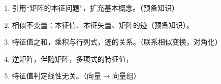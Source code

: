 

\begin{issues}
\issueDraft
\begin{enumerate}
\item 引用“矩阵的本征问题”，扩充基本概念。（预备知识）
\item 相似不变量：本征值、本征矢量、矩阵的迹（预备知识）。
\item 特征值之和，乘积与行列式，迹的关系。（联系相似变换，对角化）
\item 逆矩阵，伴随矩阵，多项式的特征值，
\item 特征值判定线性无关。（向量$\rightarrow$向量组）
\end{enumerate}
\end{issues}

